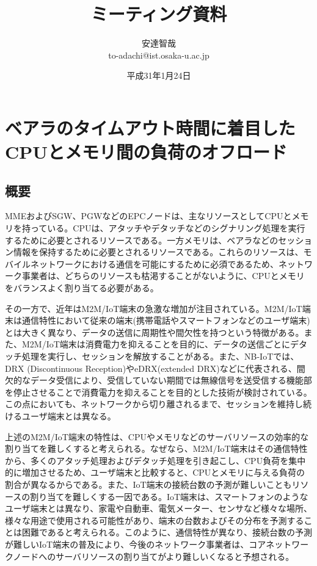 \documentclass[a4j]{ujarticle}
\title{ミーティング資料}
\author{安達智哉\\to-adachi@ist.osaka-u.ac.jp}
\date{平成31年1月24日}
\begin{document}
\maketitle

\section{ベアラのタイムアウト時間に着目したCPUとメモリ間の負荷のオフロード}

\subsection{概要}
\label{sec:abs}
MMEおよびSGW、PGWなどのEPCノードは、主なリソースとしてCPUとメモリを持っている。CPUは、アタッチやデタッチなどのシグナリング処理を実行するために必要とされるリソースである。一方メモリは、ベアラなどのセッション情報を保持するために必要とされるリソースである。これらのリソースは、モバイルネットワークにおける通信を可能にするために必須であるため、ネットワーク事業者は、どちらのリソースも枯渇することがないように、CPUとメモリをバランスよく割り当てる必要がある。

その一方で、近年はM2M/IoT端末の急激な増加が注目されている。M2M/IoT端末は通信特性において従来の端末(携帯電話やスマートフォンなどのユーザ端末)とは大きく異なり、データの送信に周期性や間欠性を持つという特徴がある。また、M2M/IoT端末は消費電力を抑えることを目的に、データの送信ごとにデタッチ処理を実行し、セッションを解放することがある。また、NB-IoTでは、DRX (Discontinuous Reception)やeDRX(extended DRX)などに代表される、間欠的なデータ受信により、受信していない期間では無線信号を送受信する機能部を停止させることで消費電力を抑えることを目的とした技術が検討されている\cite{LTERelease13におけるIoTを実現する新技術}。この点においても、ネットワークから切り離されるまで、セッションを維持し続けるユーザ端末とは異なる。

上述のM2M/IoT端末の特性は、CPUやメモリなどのサーバリソースの効率的な割り当てを難しくすると考えられる。なぜなら、M2M/IoT端末はその通信特性から、多くのアタッチ処理およびデタッチ処理を引き起こし、CPU負荷を集中的に増加させるため、ユーザ端末と比較すると、CPUとメモリに与える負荷の割合が異なるからである。また、IoT端末の接続台数の予測が難しいこともリソースの割り当てを難しくする一因である。IoT端末は、スマートフォンのようなユーザ端末とは異なり、家電や自動車、電気メーター、センサなど様々な場所、様々な用途で使用される可能性があり、端末の台数およびその分布を予測することは困難であると考えられる。このように、通信特性が異なり、接続台数の予測が難しいIoT端末の普及により、今後のネットワーク事業者は、コアネットワークノードへのサーバリソースの割り当てがより難しいくなると予想される。
\end{document}
